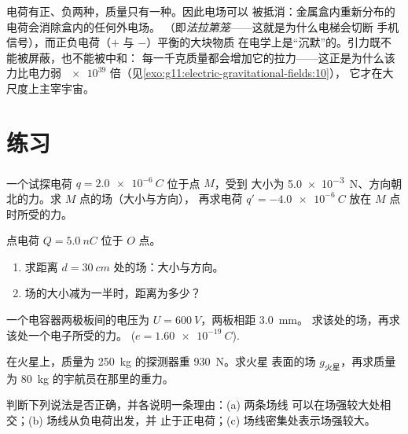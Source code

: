 \begin{remark}[类比失效之处]\label{rem:g11:electric-gravitational-fields:noanalogue}
电荷有正、负两种，质量只有一种。因此电场可以
被抵消：金属盒内重新分布的电荷会消除盒内的任何外电场。
（即\emph{法拉第笼}——这就是为什么电梯会切断
手机信号），而正负电荷（$+$ 与 $-$）平衡的大块物质
在电学上是“沉默”的。引力既不能被屏蔽，也不能被中和：
每一千克质量都会增加它的拉力——这正是为什么该力比电力弱
$\num{e39}$ 倍（见\cref{exo:g11:electric-gravitational-fields:10}），
它才在大尺度上主宰宇宙。
\end{remark}

\section{练习}

\begin{exercise}[$\star$]\label{exo:g11:electric-gravitational-fields:1}
一个试探电荷 $q = \qty{+2.0e-6}{C}$ 位于点 $M$，受到
大小为 \qty{5.0e-3}{N}、方向朝北的力。求 $M$ 点的场（大小与方向），
再求电荷 $q' = \qty{-4.0e-6}{C}$ 放在 $M$ 点时所受的力。
\end{exercise}

\begin{exercise}[$\star$]\label{exo:g11:electric-gravitational-fields:2}
点电荷 $Q = \qty{+5.0}{nC}$ 位于 $O$ 点。
\begin{enumerate}
  \item 求距离 $d = \qty{30}{cm}$ 处的场：大小与方向。
  \item 场的大小减为一半时，距离为多少？
\end{enumerate}
\end{exercise}

\begin{exercise}[$\star$]\label{exo:g11:electric-gravitational-fields:3}
一个电容器两极板间的电压为 $U = \qty{600}{V}$，两板相距 \qty{3.0}{mm}。
求该处的场，再求该处一个电子所受的力。
($e = \qty{1.60e-19}{C}$).
\end{exercise}

\begin{exercise}[$\star$]\label{exo:g11:electric-gravitational-fields:4}
在火星上，质量为 \qty{250}{kg} 的探测器重 \qty{930}{N}。求火星
表面的场 $g_{\text{火星}}$，再求质量为 \qty{80}{kg}
的宇航员在那里的重力。
\end{exercise}

\begin{exercise}[$\star$]\label{exo:g11:electric-gravitational-fields:5}
判断下列说法是否正确，并各说明一条理由：(a) 两条场线
可以在场强较大处相交；(b) 场线从负电荷出发，并
止于正电荷；(c) 场线密集处表示场强较大。
\end{exercise}

